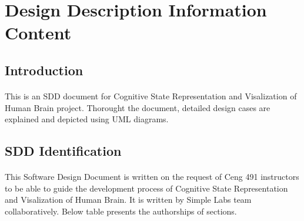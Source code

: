 
\newpage

\section{Design Description Information Content}

\subsection{Introduction}
\paragraph{}
\normalsize
    This is an SDD document for Cognitive State Representation and Visalization of Human Brain project. Thorought the document, detailed design cases are explained and depicted using UML diagrams. 
\skipsubsection
    

\subsection{SDD Identification}
\paragraph{}
\normalsize
    This Software Design Document is written on the request of Ceng 491 instructors to be able to guide the development process of Cognitive State Representation and Visalization of Human Brain. It is written by Simple Labs team collaboratively. Below table presents the authorships of sections. 
    
